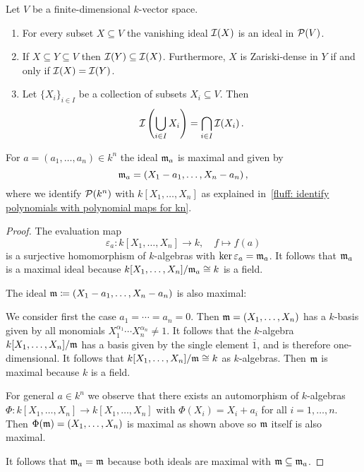 \begin{lemma}
  \label{lemma: basic properties of I}
  Let $V$ be a finite-dimensional $k$-vector space.
  \begin{enumerate}
    \item
      For every subset $X \subseteq V$ the vanishing ideal $\mathcal{I}(X)$ is an ideal in $\mathcal{P}(V)$.
    \item
      If $X \subseteq Y \subseteq V$ then $\mathcal{I}(Y) \subseteq \mathcal{I}(X)$.
      Furthermore, $X$ is Zariski-dense in $Y$ if and only if $\mathcal{I}(X) = \mathcal{I}(Y)$.
    \item
      Let $\{X_i\}_{i \in I}$ be a collection of subsets $X_i \subseteq V$. Then
      \[
          \mathcal{I}\left( \bigcup_{i \in I} X_i \right)
        = \bigcap_{i \in I} \mathcal{I}(X_i) \,.
      \]
  \end{enumerate}
\end{lemma}


\begin{lemma}
  \label{lemma: maximal ideal correspondin to a point}
  For $a = (a_1, \dotsc, a_n) \in k^n$ the ideal $\mathfrak{m}_a$ is maximal and given by
  \[
    \mathfrak{m}_a = (X_1 - a_1, \dotsc, X_n - a_n) \,,
  \]
  where we identify $\mathcal{P}(k^n)$ with $k[X_1, \dotsc, X_n]$ as explained in~\ref{fluff: identify polynomials with polynomial maps for kn}.
\end{lemma}


\begin{proof}
  The evaluation map
  \[
            \varepsilon_a
    \colon  k[X_1, \dotsc, X_n]
    \to     k,
    \quad   f
    \mapsto f(a)
  \]
  is a surjective homomorphism of $k$-algebras with $\ker \varepsilon_a = \mathfrak{m}_a$.
  It follows that $\mathfrak{m}_a$ is a maximal ideal because $k[X_1, \dotsc, X_n]/\mathfrak{m}_a \cong k$ is a field.
  
  The ideal $\mathfrak{m} \coloneqq (X_1 - a_1, \dotsc, X_n - a_n)$ is also maximal:
  
  We consider first the case $a_1 = \dotsb = a_n = 0$.
  Then $\mathfrak{m} = (X_1, \dotsc, X_n)$ has a $k$-basis given by all monomials $X_1^{\alpha_1} \dotsm X_n^{\alpha_n} \neq 1$.
  It follows that the $k$-algebra $k[X_1, \dotsc, X_n]/\mathfrak{m}$ has a basis given by the single element $\overline{1}$, and is therefore one-dimensional.
  It follows that $k[X_1, \dotsc, X_n]/\mathfrak{m} \cong k$ as $k$-algebras.
  Then $\mathfrak{m}$ is maximal because $k$ is a field.
  
  For general $a \in k^n$ we observe that there exists an automorphism of $k$-algebras $\Phi \colon k[X_1, \dotsc, X_n] \to k[X_1, \dotsc, X_n]$ with $\Phi(X_i) =  X_i + a_i$ for all $i = 1, \dotsc, n$.
  Then $\Phi(\mathfrak{m}) = (X_1, \dotsc, X_n)$ is maximal as shown above so $\mathfrak{m}$ itself is also maximal.
  
  It follows that $\mathfrak{m}_a = \mathfrak{m}$ because both ideals are maximal with $\mathfrak{m} \subseteq \mathfrak{m}_a$.
\end{proof}



